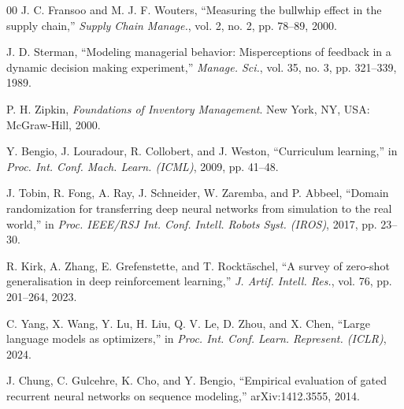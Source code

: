 \documentclass[conference]{IEEEtran}
\begin{document}
\begin{thebibliography}{00}
 J. C. Fransoo and M. J. F. Wouters, ``Measuring the bullwhip effect in the supply chain,'' \emph{Supply Chain Manage.}, vol. 2, no. 2, pp. 78--89, 2000.

 J. D. Sterman, ``Modeling managerial behavior: Misperceptions of feedback in a dynamic decision making experiment,'' \emph{Manage. Sci.}, vol. 35, no. 3, pp. 321--339, 1989.

 P. H. Zipkin, \emph{Foundations of Inventory Management}. New York, NY, USA: McGraw-Hill, 2000.

 Y. Bengio, J. Louradour, R. Collobert, and J. Weston, ``Curriculum learning,'' in \emph{Proc. Int. Conf. Mach. Learn. (ICML)}, 2009, pp. 41--48.

 J. Tobin, R. Fong, A. Ray, J. Schneider, W. Zaremba, and P. Abbeel, ``Domain randomization for transferring deep neural networks from simulation to the real world,'' in \emph{Proc. IEEE/RSJ Int. Conf. Intell. Robots Syst. (IROS)}, 2017, pp. 23--30.

 R. Kirk, A. Zhang, E. Grefenstette, and T. Rockt\"{a}schel, ``A survey of zero-shot generalisation in deep reinforcement learning,'' \emph{J. Artif. Intell. Res.}, vol. 76, pp. 201--264, 2023.

 C. Yang, X. Wang, Y. Lu, H. Liu, Q. V. Le, D. Zhou, and X. Chen, ``Large language models as optimizers,'' in \emph{Proc. Int. Conf. Learn. Represent. (ICLR)}, 2024.

 J. Chung, C. Gulcehre, K. Cho, and Y. Bengio, ``Empirical evaluation of gated recurrent neural networks on sequence modeling,'' arXiv:1412.3555, 2014.

\end{thebibliography}
\end{document}
